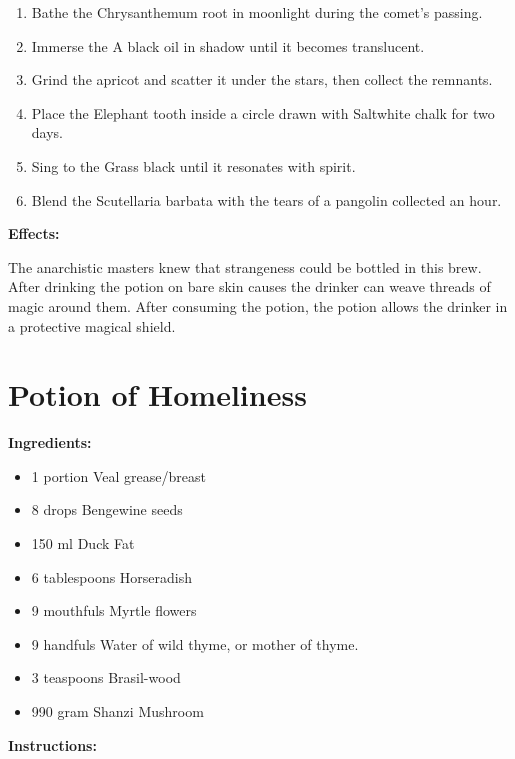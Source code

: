 \documentclass{article}
\begin{document}
\begin{enumerate}
  \item Bathe the Chrysanthemum root in moonlight during the comet’s passing.
  \item Immerse the A black oil in shadow until it becomes translucent.
  \item Grind the apricot and scatter it under the stars, then collect the remnants.
  \item Place the Elephant tooth inside a circle drawn with Saltwhite chalk for two days.
  \item Sing to the Grass black until it resonates with spirit.
  \item Blend the Scutellaria barbata with the tears of a pangolin collected an hour.
\end{enumerate}

\textbf{Effects:}

The anarchistic masters knew that strangeness could be bottled in this brew. After drinking the potion on bare skin causes the drinker can weave threads of magic around them. After consuming the potion, the potion allows the drinker in a protective magical shield.

\newpage
\section*{Potion of Homeliness}

\textbf{Ingredients:}

\begin{itemize}
  \item 1 portion Veal grease/breast
  \item 8 drops Bengewine seeds
  \item 150 ml Duck Fat
  \item 6 tablespoons Horseradish
  \item 9 mouthfuls Myrtle flowers
  \item 9 handfuls Water of wild thyme, or mother of thyme.
  \item 3 teaspoons Brasil-wood
  \item 990 gram Shanzi Mushroom
\end{itemize}

\textbf{Instructions:}
\end{document}
